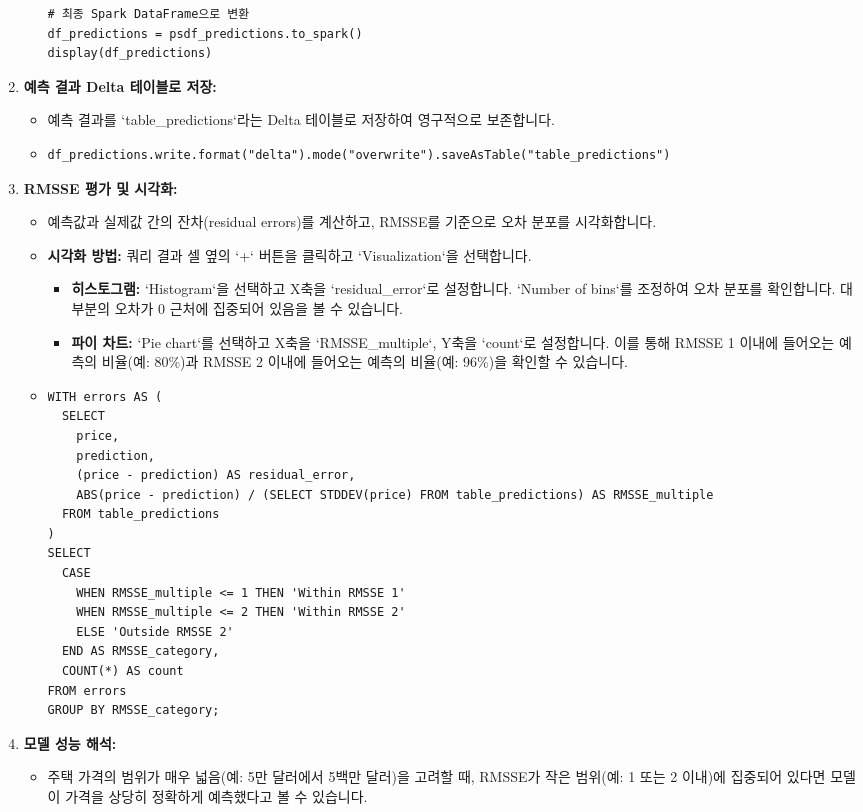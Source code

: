 \documentclass[11pt,a4paper]{article}
\begin{document}
\begin{enumerate}
\begin{itemize}
\begin{lstlisting}[caption=예측 수행 코드]
# 최종 Spark DataFrame으로 변환
df_predictions = psdf_predictions.to_spark()
display(df_predictions)
        \end{lstlisting}
    \end{itemize}
    \item \textbf{예측 결과 Delta 테이블로 저장:}
    \begin{itemize}
        \item 예측 결과를 `table_predictions`라는 Delta 테이블로 저장하여 영구적으로 보존합니다.
        \item \lstset{language=Python}
        \begin{lstlisting}[caption=예측 결과 Delta 테이블 저장 코드]
df_predictions.write.format("delta").mode("overwrite").saveAsTable("table_predictions")
        \end{lstlisting}
    \end{itemize}
    \item \textbf{RMSSE 평가 및 시각화:}
    \begin{itemize}
        \item 예측값과 실제값 간의 잔차(residual errors)를 계산하고, RMSSE를 기준으로 오차 분포를 시각화합니다.
        \item \textbf{시각화 방법:} 쿼리 결과 셀 옆의 `+` 버튼을 클릭하고 `Visualization`을 선택합니다.
        \begin{itemize}
            \item \textbf{히스토그램:} `Histogram`을 선택하고 X축을 `residual_error`로 설정합니다. `Number of bins`를 조정하여 오차 분포를 확인합니다. 대부분의 오차가 0 근처에 집중되어 있음을 볼 수 있습니다.
            \item \textbf{파이 차트:} `Pie chart`를 선택하고 X축을 `RMSSE_multiple`, Y축을 `count`로 설정합니다. 이를 통해 RMSSE 1 이내에 들어오는 예측의 비율(예: 80\%)과 RMSSE 2 이내에 들어오는 예측의 비율(예: 96\%)을 확인할 수 있습니다.
        \end{itemize}
        \item \lstset{language=SQL}
        \begin{lstlisting}[caption=RMSSE 평가 및 시각화 쿼리]
%sql
WITH errors AS (
  SELECT
    price,
    prediction,
    (price - prediction) AS residual_error,
    ABS(price - prediction) / (SELECT STDDEV(price) FROM table_predictions) AS RMSSE_multiple
  FROM table_predictions
)
SELECT
  CASE
    WHEN RMSSE_multiple <= 1 THEN 'Within RMSSE 1'
    WHEN RMSSE_multiple <= 2 THEN 'Within RMSSE 2'
    ELSE 'Outside RMSSE 2'
  END AS RMSSE_category,
  COUNT(*) AS count
FROM errors
GROUP BY RMSSE_category;
        \end{lstlisting}
    \end{itemize}
    \item \textbf{모델 성능 해석:}
    \begin{itemize}
        \item 주택 가격의 범위가 매우 넓음(예: 5만 달러에서 5백만 달러)을 고려할 때, RMSSE가 작은 범위(예: 1 또는 2 이내)에 집중되어 있다면 모델이 가격을 상당히 정확하게 예측했다고 볼 수 있습니다.
    \end{itemize}
\end{enumerate}
\end{document}
